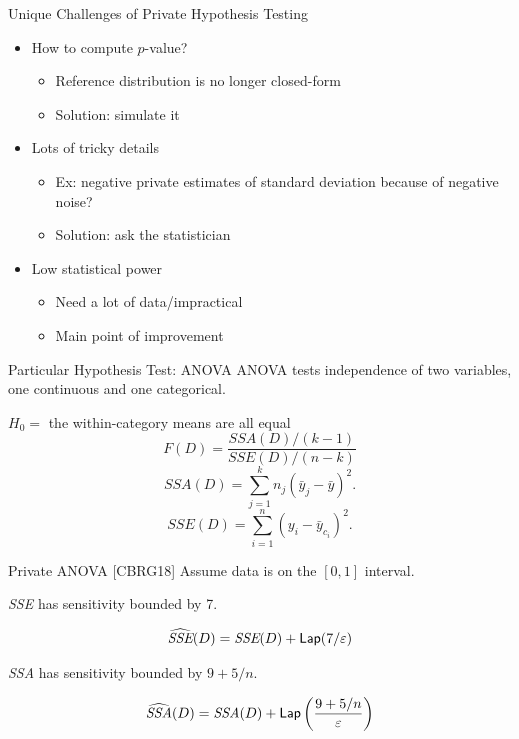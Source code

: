 \documentclass{beamer}
\newcommand{\sse}{\textit{SSE}\xspace}
\newcommand{\ssa}{\textit{SSA}\xspace}
\newcommand{\lap}{\ensuremath{{\sf Lap}}\xspace}
\begin{document}
\begin{frame}{Unique Challenges of Private Hypothesis Testing}
\begin{itemize}
    \item How to compute $p$-value? \pause
        \begin{itemize}
            \item Reference distribution is no longer closed-form \pause
            \item Solution: simulate it
        \end{itemize}
    \item Lots of tricky details \pause
        \begin{itemize}
            \item Ex: negative private estimates of standard deviation because of negative noise? \pause
            \item Solution: ask the statistician \pause
        \end{itemize}
    \item Low statistical power \pause
        \begin{itemize}
            \item Need a lot of data/impractical \pause
            \item Main point of improvement
        \end{itemize}
\end{itemize}
\end{frame}


\begin{frame}{Particular Hypothesis Test: ANOVA}
ANOVA tests independence of two variables, one continuous and one categorical.\pause
\bigskip

$H_0=$ the within-category means are all equal \pause
\begin{equation*}
F(D) = \frac{\ssa(D)/(k-1)}{\sse(D)/(n-k)}
\end{equation*} 
\pause
\begin{equation*}
\ssa(D) = \sum_{j=1}^{k} n_j (\bar{y}_j - \bar{y})^2.
\end{equation*}
\pause
\begin{equation*}
\sse(D) = \sum_{i=1}^{n}  (y_{i}-\bar{y}_{c_i})^2.
\end{equation*}
\end{frame}

\begin{frame}{Private ANOVA [CBRG18]}
Assume data is on the $[0,1]$ interval. \pause
\begin{theorem}
\sse has sensitivity bounded by 7.
\end{theorem}
\pause
$$\widehat{\sse}(D) = \sse(D) + \lap(7/\varepsilon) $$
\pause
\begin{theorem}
\ssa has sensitivity bounded by $9 + 5/n$.
\end{theorem}
\pause
$$\widehat{\ssa}(D) = \ssa(D) + \lap\left(\frac{9+5/n}{\varepsilon}\right) $$
\end{frame}
\end{document}
